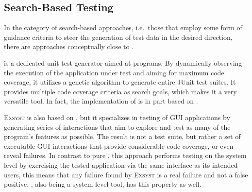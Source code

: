 \subsection{Search-Based Testing}
In the category of search-based approaches, i.e.\ those that employ some form of guidance criteria to steer the
generation of test data in the desired direction, there are approaches conceptually close to \xmlmate.

\evosuite{}\cite{fraser2013whole} is a dedicated unit test generator aimed at \java programs. By
dynamically observing the execution of the application under test and aiming for maximum code coverage, it
utilizes a genetic algorithm to generate entire JUnit test suites. It provides multiple code coverage
criteria as search goals, which makes it a very versatile tool. In fact, the implementation of \xmlmate is
in part based on \evosuite.

\textsc{Exsyst}\cite{gross-issta2012} is also based on \evosuite, but it specializes in testing of \java
GUI applications by generating series of interactions that aim to explore and test as many of the program's
features as possible. The result is not a test suite, but rather a set of executable GUI interactions that
provide considerable code coverage, or even reveal failures. In contrast to pure \evosuite, this approach
performs testing on the system level by exercising the tested application via the same interface as its
intended users, this means that any failure found by \textsc{Exsyst} is a real failure and not a false
positive. \xmlmate, also being a system level tool, has this property as well.
